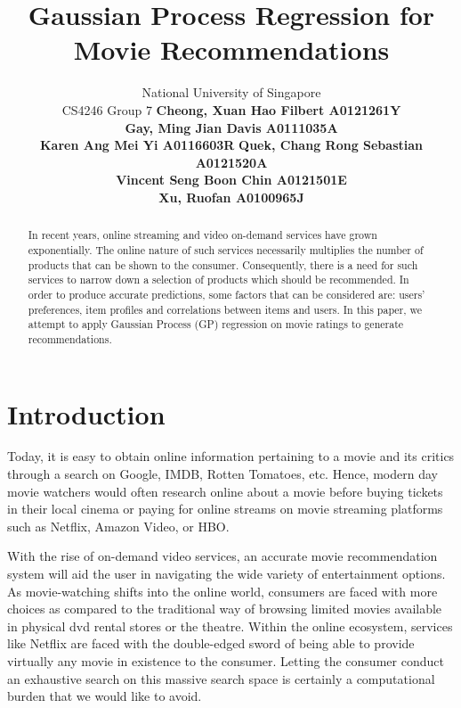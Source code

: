 \documentclass[letterpaper]{article}
\begin{document}
%
\title{Gaussian Process Regression for Movie Recommendations}
\author{
National University of Singapore \\
CS4246 Group 7 \AND
\normalsize\normalfont\textbf{Cheong, Xuan Hao Filbert A0121261Y} \\ 
\normalsize\normalfont\textbf{Gay, Ming Jian Davis A0111035A} \\
\normalsize\normalfont\textbf{Karen Ang Mei Yi A0116603R} \And
\normalsize\normalfont\textbf{Quek, Chang Rong Sebastian A0121520A} \\
\normalsize\normalfont\textbf{Vincent Seng Boon Chin A0121501E} \\
\normalsize\normalfont\textbf{Xu, Ruofan A0100965J} 
}

\maketitle
\begin{abstract}
In recent years, online streaming and video on-demand services have grown exponentially. The online nature of such services necessarily multiplies the number of products that can be shown to the consumer. Consequently, there is a need for such services to narrow down a selection of products which should be recommended. In order to produce accurate predictions, some factors that can be considered are: users' preferences, item profiles and correlations between items and users. In this paper, we attempt to apply Gaussian Process (GP) regression on movie ratings to generate recommendations.
\end{abstract}

\section{Introduction}
\noindent Today, it is easy to obtain online information pertaining to a movie and its critics through a search on Google, IMDB, Rotten Tomatoes, etc. Hence, modern day movie watchers would often research online about a movie before buying tickets in their local cinema or paying for online streams on movie streaming platforms such as Netflix, Amazon Video, or HBO.

With the rise of on-demand video services, an accurate movie recommendation system will aid the user in navigating the wide variety of entertainment options. As movie-watching shifts into the online world, consumers are faced with more choices as compared to the traditional way of browsing limited movies available in physical dvd rental stores or the theatre. Within the online ecosystem, services like Netflix are faced with the double-edged sword of being able to provide virtually any movie in existence to the consumer. Letting the consumer conduct an exhaustive search on this massive search space is certainly a computational burden that we would like to avoid.
\end{document}
